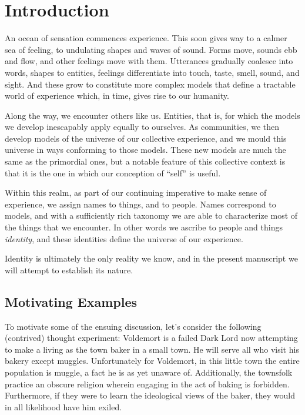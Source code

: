 \documentclass[pra,twocolumn,groupedaddress,10pt]{revtex4}
\theoremstyle{definition}
\begin{document}
\maketitle

\tableofcontents

\section{Introduction} \label{sec:introduction}

An ocean of sensation commences experience. This soon gives way to a calmer sea of feeling, to undulating shapes and waves of sound. Forms move, sounds ebb and flow, and other feelings move with them. Utterances gradually coalesce into words, shapes to entities, feelings differentiate into touch, taste, smell, sound, and sight. And these grow to constitute more complex models that define a tractable world of experience which, in time, gives rise to our humanity.

Along the way, we encounter others like us. Entities, that is, for which the models we develop inescapably apply equally to ourselves. As communities, we then develop models of the universe of our collective experience, and we mould this universe in ways conforming to those models. These new models are much the same as the primordial ones, but a notable feature of this collective context is that it is the one in which our conception of ``self'' is useful.

Within this realm, as part of our continuing imperative to make sense of experience, we assign names to things, and to people. Names correspond to models, and with a sufficiently rich taxonomy we are able to characterize most of the things that we encounter. In other words we ascribe to people and things \textit{identity}, and these identities define the universe of our experience.

Identity is ultimately the only reality we know, and in the present manuscript we will attempt to establish its nature.

\subsection{Motivating Examples} \label{sec:motexa}

To motivate some of the ensuing discussion, let's consider the following (contrived) thought experiment: Voldemort is a failed Dark Lord now attempting to make a living as the town baker in a small town. He will serve all who visit his bakery except muggles. Unfortunately for Voldemort, in this little town the entire population is muggle, a fact he is as yet unaware of. Additionally, the townsfolk practice an obscure religion wherein engaging in the act of baking is forbidden. Furthermore, if they were to learn the ideological views of the baker, they would in all likelihood have him exiled.
\end{document}
